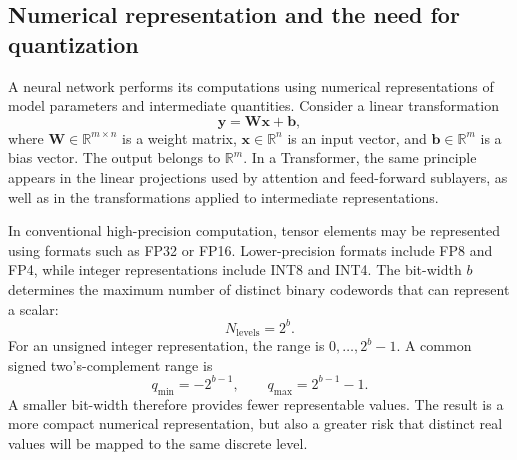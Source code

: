 \subsection{Numerical representation and the need for quantization}
\label{subsec:quant-numerical-representation}

A neural network performs its computations using numerical representations
of model parameters and intermediate quantities. Consider a linear
transformation
\begin{equation}
    \mathbf{y}=\mathbf{W}\mathbf{x}+\mathbf{b},
    \label{eq:quant-linear-layer}
\end{equation}
where
\(\mathbf{W}\in\mathbb{R}^{m\times n}\) is a weight matrix,
\(\mathbf{x}\in\mathbb{R}^{n}\) is an input vector, and
\(\mathbf{b}\in\mathbb{R}^{m}\) is a bias vector. The output belongs to
\(\mathbb{R}^{m}\). In a Transformer, the same principle appears in the
linear projections used by attention and feed-forward sublayers, as well
as in the transformations applied to intermediate representations.

In conventional high-precision computation, tensor elements may be
represented using formats such as FP32 or FP16. Lower-precision formats
include FP8 and FP4, while integer representations include INT8 and INT4.
The bit-width \(b\) determines the maximum number of distinct binary
codewords that can represent a scalar:
\begin{equation}
    N_{\mathrm{levels}}=2^b.
    \label{eq:quant-number-levels}
\end{equation}
For an unsigned integer representation, the range is
\(0,\ldots,2^b-1\). A common signed two's-complement range is
\begin{equation}
    q_{\min}=-2^{b-1},
    \qquad
    q_{\max}=2^{b-1}-1.
    \label{eq:quant-signed-range}
\end{equation}
A smaller bit-width therefore provides fewer representable values. The
result is a more compact numerical representation, but also a greater
risk that distinct real values will be mapped to the same discrete level.

